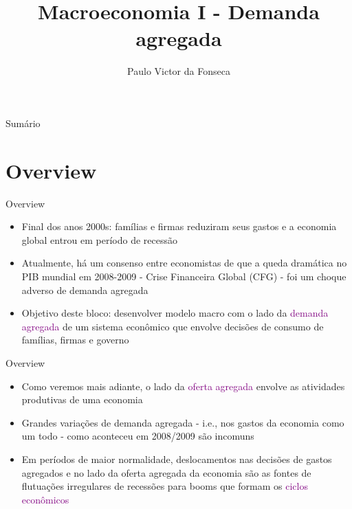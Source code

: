 \documentclass[10pt]{beamer}
\title[]{Macroeconomia I - Demanda agregada}
\author[]{Paulo Victor da Fonseca}
\date{}
\begin{document}
\begin{frame}[plain]
\end{frame}

\begin{frame}{Sumário}
    \tableofcontents
\end{frame}

\section{Overview}
\begin{frame}{Overview}
    \begin{itemize}
        \item Final dos anos 2000s: famílias e firmas reduziram seus gastos e a economia global entrou em período de recessão\bigskip
         
        \item Atualmente, há um consenso entre economistas de que a queda dramática no PIB mundial em 2008-2009 - Crise Financeira Global (CFG) - foi um choque adverso de demanda agregada\bigskip
         
        \item Objetivo deste bloco: desenvolver modelo macro com o lado da \textcolor{purple}{demanda agregada} de um sistema econômico que envolve decisões de consumo de famílias, firmas e governo
    \end{itemize}
\end{frame}

\begin{frame}{Overview}
    \begin{itemize}
        \item Como veremos mais adiante, o lado da \textcolor{purple}{oferta agregada} envolve as atividades produtivas de uma economia\bigskip
         
        \item Grandes variações de demanda agregada - i.e., nos gastos da economia como um todo - como aconteceu em 2008/2009 são incomuns\bigskip
         
        \item Em períodos de maior normalidade, deslocamentos nas decisões de gastos agregados e no lado da oferta agregada da economia são as fontes de flutuações irregulares de recessões para booms que formam os \textcolor{purple}{ciclos econômicos}
    \end{itemize}
\end{frame}
\end{document}
